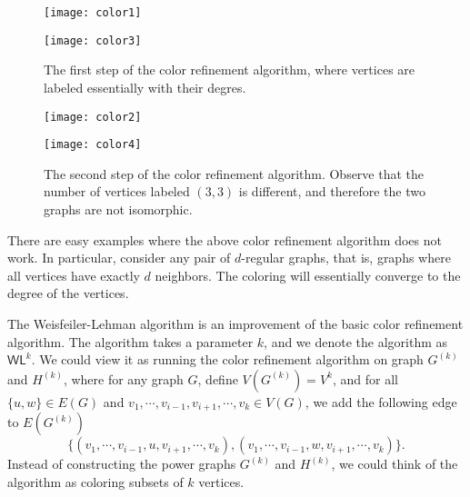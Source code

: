 \documentclass[a4paper,twoside,justified]{tufte-handout}
\begin{document}
\begin{figure}[t]
  \begin{multicols}{2}
    \begin{center}
      \texttt{[image: color1]}
    \end{center}
    \columnbreak
    \begin{center}
      \texttt{[image: color3]}
    \end{center}
  \end{multicols}
  \caption{The first step of the color refinement algorithm, where vertices are labeled essentially with their degres.}
  \label{fig:colorrefinementstep1}
\end{figure}

\begin{figure}[t]
  \begin{multicols}{2}
    \begin{center}
      \texttt{[image: color2]}
    \end{center}
    \columnbreak
    \begin{center}
      \texttt{[image: color4]}
    \end{center}
  \end{multicols}
  \caption{The second step of the color refinement algorithm. Observe that the number of vertices labeled $(3,3)$
  is different, and therefore the two graphs are not isomorphic.}
  \label{fig:colorrefinementstep2}
\end{figure}

There are easy examples where the above color refinement algorithm does not work. In particular, 
consider any pair of $d$-regular graphs, that is, graphs where all vertices have exactly $d$ neighbors.
The coloring will essentially converge to the degree of the vertices.

The Weisfeiler-Lehman algorithm is an improvement of the basic color refinement algorithm.
The algorithm takes a parameter $k$, and we denote the algorithm as $\textsf{WL}^k$.
We could view it as running the color refinement algorithm on graph $G^{(k)}$ and $H^{(k)}$, where
for any graph $G$, define $V(G^{(k)})=V^k$, and for all $\{u,w\} \in E(G)$ and $v_1,\cdots,v_{i-1},v_{i+1},\cdots,v_k \in V(G)$, 
we add the following edge to $E(G^{(k)})$
\[
\{(v_1,\cdots,v_{i-1},u,v_{i+1},\cdots,v_k),(v_1,\cdots,v_{i-1},w,v_{i+1},\cdots,v_k)\}.
\]
Instead of constructing the power graphs $G^{(k)}$ and $H^{(k)}$, we could think of the algorithm as
coloring subsets of $k$ vertices. 
\end{document}
